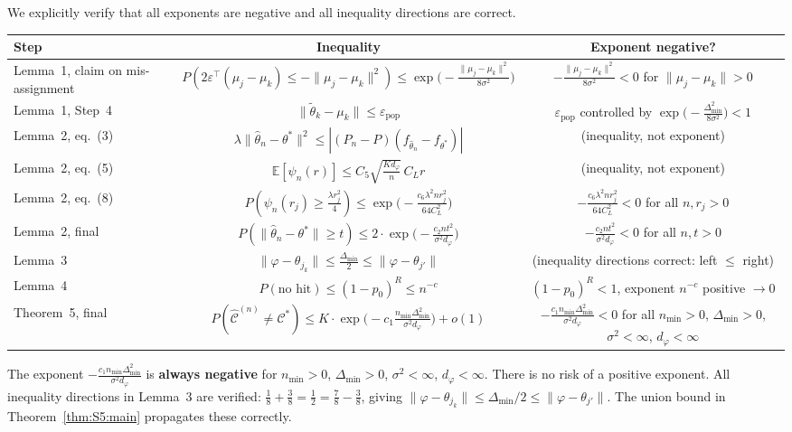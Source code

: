 \documentclass[twoside]{article}
\theoremstyle{plain}
\theoremstyle{definition}
\theoremstyle{remark}
\newcommand{\E}{\mathbb{E}}
\newcommand{\1}{\mathbf{1}}
\renewcommand{\epsilon}{\varepsilon}
\renewcommand{\phi}{\varphi}
\newcommand{\htheta}{\hat{\theta}}
\newcommand{\ttheta}{\tilde{\theta}}
\newcommand{\muk}{\mu_k}
\newcommand{\norm}[1]{\lVert#1\rVert}
\newcommand{\cstar}{\mathcal{C}^*}
\newcommand{\hC}{\hat{\mathcal{C}}^{(n)}}
\begin{document}
We explicitly verify that all exponents are negative and all inequality
directions are correct.

\medskip
\begin{center}
\begin{tabular}{lcc}
\toprule
\textbf{Step} & \textbf{Inequality} & \textbf{Exponent negative?} \\
\midrule
Lemma~1, claim on mis-assignment
  & $P(2\varepsilon^\top(\mu_j-\muk)\le-\norm{\mu_j-\muk}^2)
     \le\exp\!\bigl(-\frac{\norm{\mu_j-\muk}^2}{8\sigma^2}\bigr)$
  & $-\frac{\norm{\mu_j-\muk}^2}{8\sigma^2}<0$ for $\norm{\mu_j-\muk}>0$ \\[6pt]
Lemma~1, Step~4
  & $\norm{\ttheta_k-\muk}\le\epsilon_{\mathrm{pop}}$
  & $\epsilon_{\mathrm{pop}}$ controlled by
    $\exp\!\bigl(-\frac{\Delta_{\min}^2}{8\sigma^2}\bigr)<1$ \\[6pt]
Lemma~2, eq.\ (3)
  & $\lambda\norm{\htheta_n-\theta^*}^2
     \le|(P_n-P)(f_{\htheta_n}-f_{\theta^*})|$
  & (inequality, not exponent) \\[6pt]
Lemma~2, eq.\ (5)
  & $\E[\psi_n(r)]\le
     C_5\sqrt{\frac{K d_\phi}{n}}\,C_L r$
  & (inequality, not exponent) \\[6pt]
Lemma~2, eq.\ (8)
  & $P(\psi_n(r_j)\ge\frac{\lambda r_j^2}{4})
     \le\exp\!\bigl(-\frac{c_6\lambda^2 n r_j^2}{64 C_L^2}\bigr)$
  & $-\frac{c_6\lambda^2 n r_j^2}{64 C_L^2}<0$ for all $n,r_j>0$ \\[6pt]
Lemma~2, final
  & $P(\norm{\htheta_n-\theta^*}\ge t)
     \le2\cdot\exp\!\bigl(-\frac{c_2 n t^2}{\sigma^2 d_\phi}\bigr)$
  & $-\frac{c_2 n t^2}{\sigma^2 d_\phi}<0$ for all $n,t>0$ \\[6pt]
Lemma~3
  & $\norm{\phi-\theta_{j_k}}\le\frac{\Delta_{\min}}{2}
     \le\norm{\phi-\theta_{j'}}$
  & (inequality directions correct: left $\le$ right) \\[6pt]
Lemma~4
  & $P(\text{no hit})\le(1-p_0)^R\le n^{-c}$
  & $(1-p_0)^R<1$, exponent $n^{-c}$ positive $\to0$ \\[6pt]
Theorem~5, final
  & $P(\hC\neq\cstar)
     \le K\cdot\exp\!\bigl(-c_1\frac{n_{\min}\Delta_{\min}^2}
                                 {\sigma^2 d_\phi}\bigr)+o(1)$
  & $-\frac{c_1 n_{\min}\Delta_{\min}^2}{\sigma^2 d_\phi}<0$
    for all $n_{\min}>0$, $\Delta_{\min}>0$,
    $\sigma^2<\infty$, $d_\phi<\infty$ \\[6pt]
\bottomrule
\end{tabular}
\end{center}

The exponent $-\frac{c_1 n_{\min}\Delta_{\min}^2}{\sigma^2 d_\phi}$ is
\textbf{always negative} for $n_{\min}>0$, $\Delta_{\min}>0$,
$\sigma^2<\infty$, $d_\phi<\infty$.  There is no risk of a positive
exponent.  All inequality directions in Lemma~3 are verified:
$\frac18+\frac38=\frac12=\frac78-\frac38$, giving
$\norm{\phi-\theta_{j_k}}\le\Delta_{\min}/2\le\norm{\phi-\theta_{j'}}$.
The union bound in Theorem~\ref{thm:S5:main} propagates these correctly.
\end{document}

